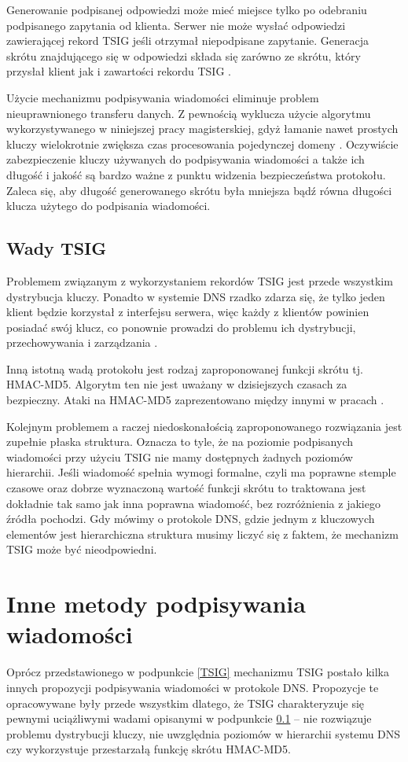 Generowanie podpisanej odpowiedzi może mieć miejsce tylko po odebraniu podpisanego zapytania od klienta. Serwer nie może wysłać
odpowiedzi zawierającej rekord TSIG jeśli otrzymał niepodpisane zapytanie. Generacja skrótu znajdującego się w odpowiedzi składa
się zarówno ze skrótu, który przysłał klient jak i zawartości rekordu TSIG \cite{nask-tsig}.

Użycie mechanizmu podpisywania wiadomości eliminuje problem nieuprawnionego transferu danych. Z pewnością wyklucza
użycie algorytmu wykorzystywanego w niniejszej pracy magisterskiej, gdyż łamanie nawet prostych kluczy wielokrotnie zwiększa czas
procesowania pojedynczej domeny \cite{nask-tsig}. Oczywiście zabezpieczenie kluczy używanych do podpisywania wiadomości a także ich
długość i jakość są bardzo ważne z punktu widzenia bezpieczeństwa protokołu. Zaleca się, aby długość generowanego skrótu była mniejsza
bądź równa długości klucza użytego do podpisania wiadomości.

\subsection{Wady TSIG}
\label{wady-tsig}
Problemem związanym z wykorzystaniem rekordów TSIG jest przede wszystkim dystrybucja kluczy. Ponadto w systemie DNS rzadko zdarza się,
że tylko jeden klient będzie korzystał z interfejsu serwera, więc każdy z klientów powinien posiadać swój klucz, co ponownie prowadzi
do problemu ich dystrybucji, przechowywania i zarządzania \cite{nask-tsig}.

Inną istotną wadą protokołu jest rodzaj zaproponowanej funkcji skrótu tj. HMAC-MD5. Algorytm ten nie jest uważany w dzisiejszych czasach
za bezpieczny. Ataki na HMAC-MD5 zaprezentowano między innymi w pracach \cite{hmac-md5-attack, hmac-md5-cryptoanalisys}.

Kolejnym problemem a raczej niedoskonałością zaproponowanego rozwiązania jest zupełnie płaska struktura. Oznacza to tyle, że na
poziomie podpisanych wiadomości przy użyciu TSIG nie mamy dostępnych żadnych poziomów hierarchii. Jeśli wiadomość spełnia wymogi
formalne, czyli ma poprawne stemple czasowe oraz dobrze wyznaczoną wartość funkcji skrótu to traktowana jest dokładnie tak samo
jak inna poprawna wiadomość, bez rozróżnienia z jakiego źródła pochodzi. Gdy mówimy o protokole DNS, gdzie jednym z kluczowych
elementów jest hierarchiczna struktura musimy liczyć się z faktem, że mechanizm TSIG może być nieodpowiedni.

\section{Inne metody podpisywania wiadomości}
Oprócz przedstawionego w podpunkcie \ref{TSIG} mechanizmu TSIG postało kilka innych propozycji podpisywania wiadomości w protokole DNS.
Propozycje te opracowywane były przede wszystkim dlatego, że TSIG charakteryzuje się pewnymi uciążliwymi wadami opisanymi w podpunkcie
\ref{wady-tsig} -- nie rozwiązuje problemu dystrybucji kluczy, nie uwzględnia poziomów w hierarchii systemu DNS czy wykorzystuje
przestarzałą funkcję skrótu HMAC-MD5.

